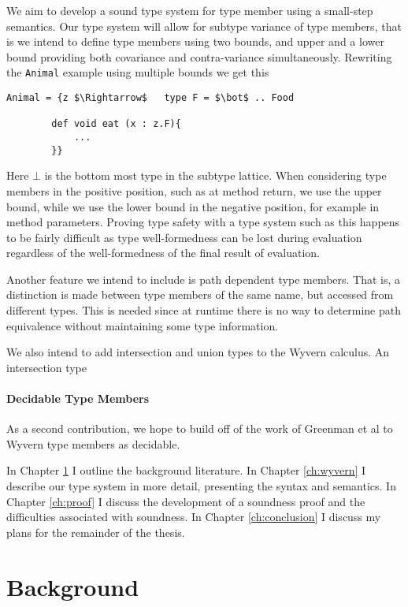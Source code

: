 \documentclass[11pt
              , a4paper
              , twoside
              , openright
              ]{report}
\numberwithin{case}{theorem}
\numberwithin{subcase}{case}
\begin{document}
We aim to develop a sound type system for type member using a small-step semantics. Our type system will allow for subtype variance of type members, that is we intend to define type members using two bounds, and upper and a lower bound providing both covariance and contra-variance simultaneously. Rewriting the \verb|Animal| example using multiple bounds we get this
\begin{lstlisting}[mathescape, style=custom_lang]
Animal = {z $\Rightarrow$	type F = $\bot$ .. Food
		
		def void eat (x : z.F){
			...
		}}
\end{lstlisting}
Here $\bot$ is the bottom most type in the subtype lattice. When considering type members in the positive position, such as at method return, we use the upper bound, while we use the lower bound in the negative position, for example in method parameters. Proving type safety with a type system such as this happens to be fairly difficult as type well-formedness can be lost during evaluation regardless of the well-formedness of the final result of evaluation.

Another feature we intend to include is path dependent type members. That is, a distinction is made between type members of the same name, but accessed from different types. This is needed since at runtime there is no way to determine path equivalence without maintaining some type information.

We also intend to add intersection and union types to the Wyvern calculus. An intersection type 

\subsubsection{Decidable Type Members}

As a second contribution, we hope to build off of the work of Greenman et al \cite{Greenman:2014:GFP:2594291.2594308} to Wyvern type members as decidable. 

In Chapter \ref{ch:background} I outline the background literature. In Chapter \ref{ch:wyvern} I describe our type system in more detail, presenting the syntax and semantics. In Chapter \ref{ch:proof} I discuss the development of a soundness proof and the difficulties associated with soundness. In Chapter \ref{ch:conclusion} I discuss my plans for the remainder of the thesis.

\chapter{Background}\label{ch:background}
\end{document}
